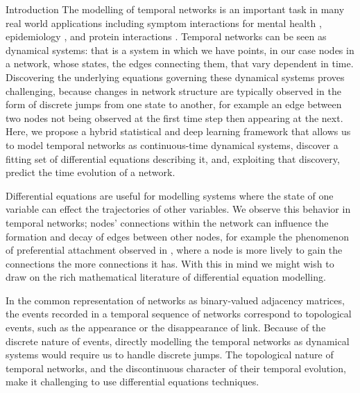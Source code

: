 \documentclass[12pt]{amsart}
\begin{document}
\begin{section}{Introduction}
    The modelling of temporal networks is an important task in many real world applications including symptom interactions for mental health \cite{jordan2020current,contreras2020temporal}, epidemiology \cite{masuda2013predicting}, and protein interactions \cite{lucas2021inferring,jin2009identifying}.
    Temporal networks can be seen as dynamical systems: that is a system in which we have points, in our case nodes in a network, whose states, the edges connecting them, that vary dependent in time.
    Discovering the underlying equations governing these dynamical systems proves challenging, because changes in network structure are typically observed in the form of discrete jumps from one state to another, for example an edge between two nodes not being observed at the first time step then appearing at the next.
    Here, we propose a hybrid statistical and deep learning framework that allows us to model temporal networks as continuous-time dynamical systems, discover a fitting set of differential equations describing it, and, exploiting that discovery, predict the time evolution of a network.

    Differential equations are useful for modelling systems where the state of one variable can effect the trajectories of other variables. We observe this behavior in temporal networks; nodes' connections within the network can influence the formation and decay of edges between other nodes, for example the phenomenon of preferential attachment observed in \cite{newman2001clustering,capocci2006preferential}, where a node is more lively to gain the connections the more connections it has. With this in mind we might wish to draw on the rich mathematical literature of differential equation modelling.

    In the common representation of networks as binary-valued adjacency matrices, the events recorded in a temporal sequence of networks correspond to topological events, such as the appearance or the disappearance of link.
    Because of the discrete nature of events, directly modelling the temporal networks as dynamical systems would require us to handle discrete jumps.
    The topological nature of temporal networks, and the discontinuous character of their temporal evolution, make it challenging to use differential equations techniques.


\end{section}
\end{document}
